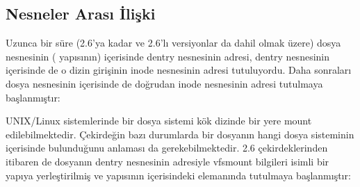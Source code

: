 \documentclass[a4paper,10pt,turkish]{sphinxmanual}
\begin{document}
\subsection{Nesneler Arası İlişki}
\label{\detokenize{filesystem1:nesneler-arasi-iliski}}
\sphinxAtStartPar
Uzunca bir süre (2.6’ya kadar ve 2.6’lı versiyonlar da dahil olmak üzere) dosya nesnesinin
( yapısının) içerisinde dentry nesnesinin adresi, dentry nesnesinin içerisinde de o dizin
girişinin inode nesnesinin adresi tutuluyordu. Daha sonraları dosya nesnesinin içerisinde de
doğrudan inode nesnesinin adresi tutulmaya başlanmıştır:


\sphinxAtStartPar
UNIX/Linux sistemlerinde bir dosya sistemi kök dizinde bir yere mount edilebilmektedir. Çekirdeğin
bazı durumlarda bir dosyanın hangi dosya sisteminin içerisinde bulunduğunu anlaması da
gerekebilmektedir. 2.6 çekirdeklerinden itibaren de dosyanın dentry nesnesinin adresiyle
vfsmount bilgileri  isimli bir yapıya yerleştirilmiş ve  yapısının içerisindeki
 elemanında tutulmaya başlanmıştır:

\begin{sphinxVerbatim}[commandchars=\\\{\}]



\end{sphinxVerbatim}
\end{document}
